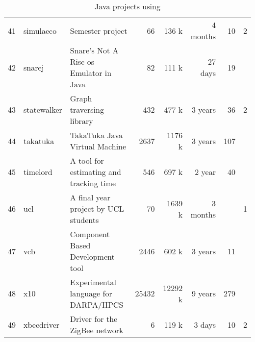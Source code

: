 \begin{table}[ht]
\begin{tabular}{|r|l|l|r|r|r|r|r|}
  41 & simulaeco & Semester project  &  66 & 136 k &  4 months  &  10 & 2 \\ 
  42 & snarej & Snare's Not A Risc os Emulator in Java  &  82 & 111 k &  27 days &  19 & \\ 
  43 & statewalker & Graph traversing library   & 432 & 477 k & 3 years &  36 & 2 \\ 
  44 & takatuka & TakaTuka Java Virtual Machine   & 2637 & 1176 k & 3 years & 107 & \\ 
  45 & timelord & A tool for estimating and tracking time   & 546 & 697 k &  2 year &  40 & \\ 
  46 & ucl & A final year project by UCL students &  70 & 1639 k &  3 months & & 1 \\ 
  47 & vcb & Component Based Development tool   & 2446 & 602 k & 3 years &  11 & \\ 
  48 & x10 & Experimental language for DARPA/HPCS   & 25432 & 12292 k & 9 years & 279 & \\ 
  49 & xbeedriver & Driver for the ZigBee network  &   6 & 119 k &  3 days &  10 & 2\\ 
  \hline
\end{tabular}
\caption{Java projects using \smu{}}  \label{table:projects}
\end{table}
